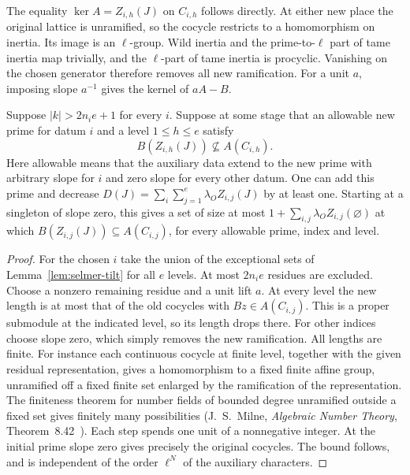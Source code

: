 The equality $\ker A=Z_{i,h}(J)$ on $C_{i,h}$ follows directly. At either new
place the original lattice is unramified, so the cocycle restricts to a
homomorphism on inertia. Its image is an $\ell$-group. Wild inertia and the
prime-to-$\ell$ part of tame inertia map trivially, and the $\ell$-part of
tame inertia is procyclic. Vanishing on the chosen generator therefore
removes all new ramification. For a unit $a$, imposing slope $a^{-1}$ gives
the kernel of $aA-B$.

\begin{proposition}\label{prop:selmer-tilt-descent}
Suppose $|k|>2n_i e+1$ for every $i$. Suppose at some stage that an allowable
new prime for datum $i$ and a level $1\leq h\leq e$ satisfy
\[
 B(Z_{i,h}(J))\not\subseteq A(C_{i,h}).
\]
Here allowable means that the auxiliary data extend to the new prime with
arbitrary slope for $i$ and zero slope for every other datum.
One can add this prime and decrease
$D(J)=\sum_i\sum_{j=1}^e\lambda_O Z_{i,j}(J)$ by at least one.
Starting at a singleton of slope zero, this gives a set of size at most
$1+\sum_{i,j}\lambda_O Z_{i,j}(\varnothing)$ at which
$B(Z_{i,j}(J))\subseteq A(C_{i,j})$, for every allowable prime, index and level.
\end{proposition}
\begin{proof}
For the chosen $i$ take the union of the exceptional sets of
Lemma~\ref{lem:selmer-tilt} for all $e$ levels. At most $2n_i e$ residues
are excluded. Choose a nonzero remaining residue and a unit lift $a$.
At every level the new length is at most that of the old cocycles with
$Bz\in A(C_{i,j})$. This is a proper submodule at the indicated level,
so its length drops there. For other indices choose slope zero, which
simply removes the new ramification. All lengths are finite. For instance
each continuous cocycle at finite level, together with the given residual
representation, gives a homomorphism to a fixed finite affine group,
unramified off a fixed finite set enlarged by the ramification of the representation.
The finiteness theorem for number fields of bounded degree unramified
outside a fixed set gives finitely many possibilities
(J.~S.~Milne, \emph{Algebraic Number Theory}, Theorem~8.42~\cite{milneANT}).
Each step spends one unit of a nonnegative integer. At the initial prime
slope zero gives precisely the original cocycles. The bound follows, and
is independent of the order $\ell^N$ of the auxiliary characters.
\end{proof}

